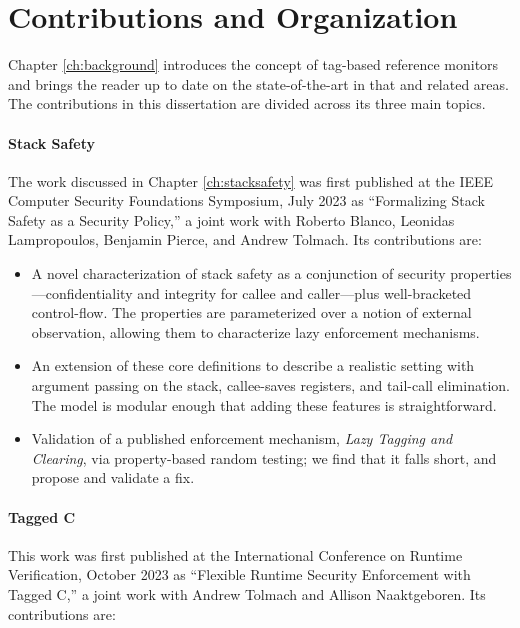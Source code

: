 \documentclass{report}
\begin{document}
\section{Contributions and Organization}

Chapter \ref{ch:background} introduces the concept of tag-based reference monitors
and brings the reader up to date on the state-of-the-art in that and related areas.
The contributions in this dissertation are divided across its three main topics.

\paragraph{Stack Safety}

The work discussed in Chapter \ref{ch:stacksafety} was first published at the
IEEE Computer Security Foundations Symposium, July 2023 as
``Formalizing Stack Safety as a Security Policy,'' a
joint work with Roberto Blanco, Leonidas Lampropoulos, Benjamin Pierce, and Andrew Tolmach.
Its contributions are:

\begin{itemize}
\item A novel characterization of stack safety as a conjunction
  of security properties---confidentiality and integrity for callee
  and caller---plus well-bracketed control-flow.
  The properties are parameterized over a notion of
  external observation, allowing them to characterize lazy enforcement
  mechanisms.
\item An extension of these core definitions to
  describe a realistic setting with argument passing on the stack,
  callee-saves registers, and tail-call elimination. The model is
  modular enough that adding these features is straightforward.
\item Validation of a published enforcement mechanism,
  \emph{Lazy Tagging and Clearing}, via property-based random testing; we find that
  it falls short, and propose and validate a fix.
\end{itemize}

\paragraph{Tagged C}

This work was first published at the International Conference on Runtime Verification,
October 2023 as ``Flexible Runtime Security Enforcement with Tagged C,'' a joint work
with Andrew Tolmach and Allison Naaktgeboren. Its contributions are:
 
\end{document}
